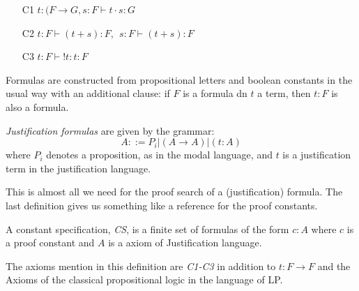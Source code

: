 \begin{rules}\label{rules} 

\begin{itemize} Application, sum and positive introspection respectively.

	\item[C1] $t:(F \rightarrow G, s:F \vdash t \cdot s: G$
	\item[C2] $t:F \vdash (t +s):F, \:\: s:F \vdash (t+s):F$
	\item[C3] $t:F \vdash !t:t:F$
\end{itemize}

\end{rules}

Formulas are constructed from propositional letters and boolean constants in the usual way with an additional clause: if $F$ is a formula dn $t$ a term, then $t:F$ is also a formula.

\begin{definition}\label{justification_formulas} \emph{Justification formulas} are given by the grammar:
\[
A ::= P_i|(A \rightarrow A) | (t:A)
\]
where $P_i$ denotes a proposition, as in the modal language, and $t$ is a justification term in the justification language.
\end{definition}

This is almost all we need for the proof search of a (justification) formula. The last definition gives us something like a reference for the proof constants.

\begin{definition}\label{cs-def} A constant specification, \emph{CS}, is a finite set of formulas of the form $c:A$ where $c$ is a proof constant and $A$ is a axiom of Justification language.
\end{definition}

The axioms mention in this definition are \emph{C1-C3} in addition to $t:F \rightarrow F$ and the Axioms of the classical propositional logic in the language of LP.

